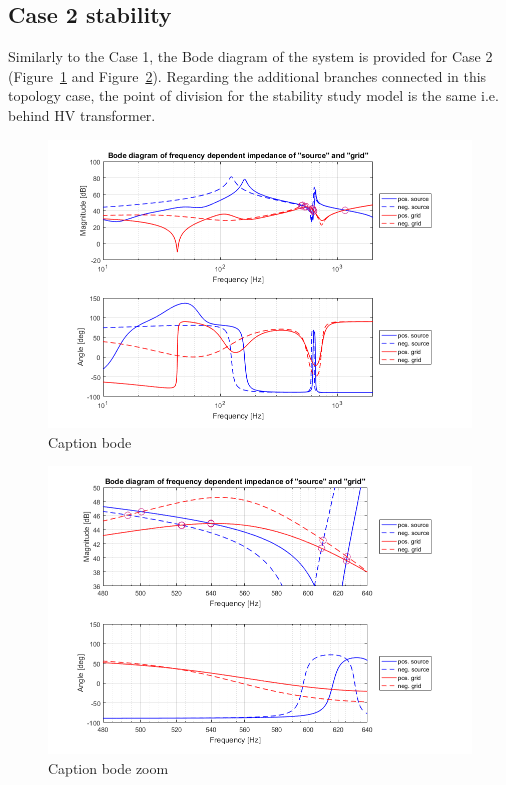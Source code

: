 \documentclass[12pt]{report} %
\begin{document}
\subsection{Case 2 stability}
Similarly to the Case 1, the Bode diagram of the system is provided for Case 2 (Figure~\ref{fig:bode_case2} and Figure~\ref{fig:bode_zoom_case2}). Regarding the additional branches connected in this topology case, the point of division for the stability study model is the same i.e. behind HV transformer.
\begin{figure}[htb]
	\centering
	\includegraphics[width=1\textwidth]{img/Case2/Case2_Bode.png}
	\caption{Caption bode}
  	\label{fig:bode_case2}
\end{figure}
\FloatBarrier

\begin{figure}[htb]
	\centering
	\includegraphics[width=1\textwidth]{img/Case2/Case2_Bode_zoom.png}
	\caption{Caption bode zoom}
  	\label{fig:bode_zoom_case2}
\end{figure}
\FloatBarrier
\end{document}

